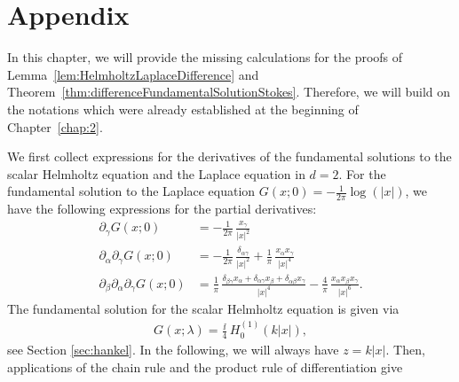 \chapter*{Appendix}
\label{chap:app}

In this chapter, we will provide the missing calculations for the proofs of Lemma~\ref{lem:HelmholtzLaplaceDifference} and Theorem~\ref{thm:differenceFundamentalSolutionStokes}.
Therefore, we will build on the notations which were already established at the beginning of Chapter~\ref{chap:2}.

We first collect expressions for the derivatives of the fundamental solutions to the scalar Helmholtz equation and the Laplace equation in $d= 2$.
For the fundamental solution to the Laplace equation $G(x; 0) = -\frac{1}{2\pi} \log(|x|)$, we have the following expressions for the partial derivatives:
\begin{align*}
  \partial_\gamma G(x; 0) &= -\frac{1}{2\pi} \, \frac{x_\gamma}{|x|^2} \\[0.5em]
  \partial_\alpha \partial_\gamma G(x; 0) &= -\frac{1}{2\pi}\, \frac{\delta_{\alpha\gamma}}{|x|^2} + \frac{1}{\pi} \, \frac{x_\alpha x_\gamma}{|x|^4} \\[0.5em]
  \partial_\beta \partial_\alpha \partial_\gamma G(x; 0)
  &= \frac{1}{\pi} \, \frac{\delta_{\beta \gamma} x_\alpha + \delta_{\alpha \gamma} x_\beta + \delta_{\alpha\beta} x_\gamma}{|x|^4} - \frac{4}{\pi}\, \frac{x_\alpha x_\beta x_\gamma}{|x|^6}.
\end{align*}
The fundamental solution for the scalar Helmholtz equation is given via 
\begin{align*}
  G(x; \lambda) = \frac{\ii}{4}\, H_0^{(1)}(k|x|),
\end{align*}
see Section \ref{sec:hankel}.
In the following, we will always have $z =  k|x|$.  
Then, applications of the chain rule and the product rule of differentiation give
